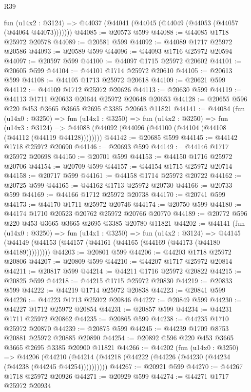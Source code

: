 \begin{lexlean}{R39}
\begin{coremodule}
    fun (u14x2 : @3124) => @44037 (@44041 (@44045 (@44049 (@44053 (@44057 (@44064 @44073)))))))
@44085 := @20573 @599
@44088 := @44085 @1718 @25972 @20578
@44089 := @20581 @599
@44092 := @44089 @1717 @25972 @20586
@44093 := @20589 @599
@44096 := @44093 @1716 @25972 @20594
@44097 := @20597 @599
@44100 := @44097 @1715 @25972 @20602
@44101 := @20605 @599
@44104 := @44101 @1714 @25972 @20610
@44105 := @20613 @599
@44108 := @44105 @1713 @25972 @20618
@44109 := @20621 @599
@44112 := @44109 @1712 @25972 @20626
@44113 := @20630 @599
@44119 := @44113 @1711 @20633 @20644 @25972 @20648 @20653
@44128 := @20655 @596 @220 @453 @3665 @3665 @2695 @3385 @20663 @11821
@44141 := @44084
    (fun (u14x0 : @3250) =>
    fun (u14x1 : @3250) =>
    fun (u14x2 : @3250) =>
    fun (u14x3 : @3124) =>
    @44088 (@44092 (@44096 (@44100 (@44104 (@44108 (@44112 (@44119 @44128))))))))
@44142 := @20685 @599
@44145 := @44142 @1718 @25972 @20690
@44146 := @20693 @599
@44149 := @44146 @1717 @25972 @20698
@44150 := @20701 @599
@44153 := @44150 @1716 @25972 @20706
@44154 := @20709 @599
@44157 := @44154 @1715 @25972 @20714
@44158 := @20717 @599
@44161 := @44158 @1714 @25972 @20722
@44162 := @20725 @599
@44165 := @44162 @1713 @25972 @20730
@44166 := @20733 @599
@44169 := @44166 @1712 @25972 @20738
@44170 := @20741 @599
@44173 := @44170 @1711 @25972 @20746
@44174 := @20750 @599
@44180 := @44174 @1710 @20523 @20762 @25972 @20766 @20770
@44189 := @20772 @596 @220 @453 @3665 @3665 @2695 @3385 @20780 @11821
@44202 := @44141
    (fun (u14x0 : @3250) =>
    fun (u14x1 : @3250) =>
    fun (u14x2 : @3124) =>
    @44145 (@44149 (@44153 (@44157 (@44161 (@44165 (@44169 (@44173 (@44180 @44189)))))))))
@44203 := @20801 @599
@44206 := @44203 @1718 @25972 @20806
@44207 := @20809 @599
@44210 := @44207 @1717 @25972 @20814
@44211 := @20817 @599
@44214 := @44211 @1716 @25972 @20822
@44215 := @20825 @599
@44218 := @44215 @1715 @25972 @20830
@44219 := @20833 @599
@44222 := @44219 @1714 @25972 @20838
@44223 := @20841 @599
@44226 := @44223 @1713 @25972 @20846
@44227 := @20849 @599
@44230 := @44227 @1712 @25972 @20854
@44231 := @20857 @599
@44234 := @44231 @1711 @25972 @20862
@44235 := @20865 @599
@44238 := @44235 @1710 @25972 @20870
@44239 := @20875 @599
@44245 := @44239 @1709 @8753 @20881 @25972 @20885 @20890
@44254 := @20892 @596 @220 @453 @3665 @3665 @2695 @3385 @20900 @11821
@44266 := @44202
    (fun (u14x0 : @3250) =>
    @44206 (@44210 (@44214 (@44218 (@44222 (@44226 (@44230 (@44234 (@44238 (@44245 @44254))))))))))
@44267 := @20921 @599
@44270 := @44267 @1718 @25972 @20926
@44271 := @20929 @599
@44274 := @44271 @1717 @25972 @20934

\end{coremodule}
\end{lexlean}
